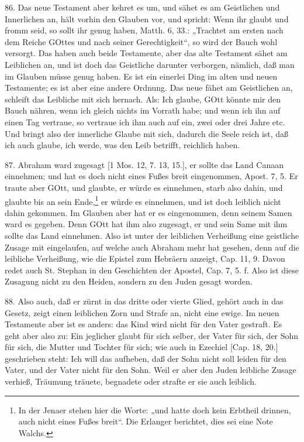86. Das neue Testament aber kehret es um, und sähet es am Geistlichen und Innerlichen an, hält vorhin den Glauben vor, und spricht: Wenn ihr glaubt und fromm seid, so sollt ihr genug haben, Matth. 6, 33.: „Trachtet am ersten nach dem Reiche GOttes und nach seiner Gerechtigkeit“, so wird der Bauch wohl versorgt. Das haben auch beide Testamente, aber das alte Testament sähet am Leiblichen an, und ist doch das Geistliche darunter verborgen, nämlich, daß man im Glauben müsse genug haben. Es ist ein einerlei Ding im alten und neuen Testamente; es ist aber eine andere Ordnung. Das neue
fähet am Geistlichen an, schleift das Leibliche mit sich hernach. Als: Ich glaube, GOtt könnte mir den Bauch nähren, wenn ich gleich nichts im Vorrath habe; und wenn ich ihn auf einen Tag vertraue, so vertraue ich ihm auch auf ein, zwei oder drei Jahre etc. Und bringt also der innerliche Glaube mit sich, dadurch die Seele reich ist, daß ich auch glaube, ich werde, was den Leib betrifft, reichlich haben.

87. Abraham ward zugesagt [1 Mos. 12, 7. 13, 15.], er sollte das Land Canaan einnehmen; und hat es doch nicht eines Fußes breit eingenommen, Apost. 7, 5. Er traute aber GOtt, und glaubte, er würde es einnehmen, starb also dahin, und glaubte bis an sein Ende,\footnote{In der Jenaer stehen hier die Worte: „und hatte doch kein Erbtheil drinnen, auch nicht eines Fußes breit“. Die Erlanger berichtet, dies sei eine Note Walchs.} er würde es einnehmen, und ist doch leiblich nicht dahin gekommen. Im Glauben aber hat er es eingenommen, denn seinem Samen ward es gegeben. Denn GOtt hat ihm also zugesagt, er und sein Same mit ihm sollte das Land einnehmen. Also ist unter der leiblichen Verheißung eine geistliche Zusage mit eingelaufen, auf welche auch Abraham mehr hat gesehen, denn auf die leibliche Verheißung, wie die Epistel zum Hebräern anzeigt, Cap. 11, 9. Davon redet auch St. Stephan in den Geschichten der Apostel, Cap. 7, 5. f. Also ist diese Zusagung nicht zu den Heiden, sondern zu den Juden gesagt worden.

88. Also auch, daß er zürnt in das dritte oder vierte Glied, gehört auch in das Gesetz, zeigt einen leiblichen Zorn und Strafe an, nicht eine ewige. Im neuen Testamente aber ist es anders: das Kind wird nicht für den Vater gestraft. Es geht aber also zu: Ein jeglicher glaubt für sich selber, der Vater für sich, der Sohn für sich, die Mutter und Tochter für sich; wie auch in Ezechiel [Cap. 18, 20.] geschrieben steht: Ich will das aufheben, daß der Sohn nicht soll leiden für den Vater, und der Vater nicht für den Sohn. Weil er aber den Juden leibliche Zusage verhieß, Träumung träuete, begnadete oder strafte er sie auch leiblich.

